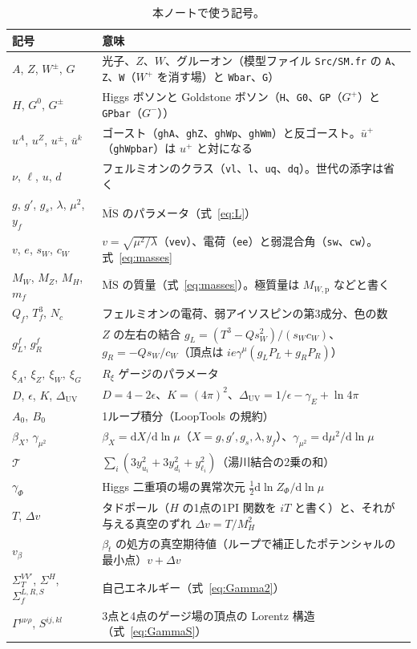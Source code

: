 \documentclass[a4paper,10pt]{ltjsarticle}
\newcommand{\dd}{\mathrm{d}}
\newcommand{\MSbar}{\overline{\mathrm{MS}}}
\newcommand{\DUV}{\Delta_{\mathrm{UV}}}
\newcommand{\sw}{s_W}
\newcommand{\cw}{c_W}
\begin{document}
\begin{table}[tbp]
\centering\small
\caption{本ノートで使う記号。}
\label{tab:notation}
\begin{tabularx}{\linewidth}{>{\raggedright\arraybackslash}p{4.1cm}X}
\toprule
\textbf{記号} & \textbf{意味} \\
\midrule
$A$, $Z$, $W^\pm$, $G$ & 光子、$Z$、$W$、グルーオン（模型ファイル \texttt{Src/SM.fr} の \texttt{A}、\texttt{Z}、\texttt{W}（$W^+$ を消す場）と \texttt{Wbar}、\texttt{G}） \\
$H$, $G^0$, $G^\pm$ & Higgs ボソンと Goldstone ボソン（\texttt{H}、\texttt{G0}、\texttt{GP}（$G^+$）と \texttt{GPbar}（$G^-$）） \\
$u^A$, $u^Z$, $u^\pm$, $\bar u^k$ & ゴースト（\texttt{ghA}、\texttt{ghZ}、\texttt{ghWp}、\texttt{ghWm}）と反ゴースト。$\bar u^+$（\texttt{ghWpbar}）は $u^+$ と対になる \\
$\nu$, $\ell$, $u$, $d$ & フェルミオンのクラス（\texttt{vl}、\texttt{l}、\texttt{uq}、\texttt{dq}）。世代の添字は省く \\
$g$, $g'$, $g_s$, $\lambda$, $\mu^2$, $y_f$ & $\MSbar$ のパラメータ（式~\eqref{eq:L}） \\
$v$, $e$, $\sw$, $\cw$ & $v=\sqrt{\mu^2/\lambda}$（\texttt{vev}）、電荷（\texttt{ee}）と弱混合角（\texttt{sw}、\texttt{cw}）。式~\eqref{eq:masses} \\
$M_W$, $M_Z$, $M_H$, $m_f$ & $\MSbar$ の質量（式~\eqref{eq:masses}）。極質量は $M_{W,\mathrm p}$ などと書く \\
$Q_f$, $T^3_f$, $N_c$ & フェルミオンの電荷、弱アイソスピンの第3成分、色の数 \\
$g_L^f$, $g_R^f$ & $Z$ の左右の結合 $g_L=(T^3-Q\sw^2)/(\sw\cw)$、$g_R=-Q\sw/\cw$（頂点は $ie\gamma^\mu(g_LP_L+g_RP_R)$） \\
$\xi_A,\ \xi_Z,\ \xi_W,\ \xi_G$ & $R_\xi$ ゲージのパラメータ \\
$D$, $\epsilon$, $K$, $\DUV$ & $D=4-2\epsilon$、$K=(4\pi)^2$、$\DUV=1/\epsilon-\gamma_E+\ln4\pi$ \\
$A_0,\ B_0$ & 1ループ積分（LoopTools の規約） \\
$\beta_X$, $\gamma_{\mu^2}$ & $\beta_X=\dd X/\dd\ln\mu$（$X=g,g',g_s,\lambda,y_f$）、$\gamma_{\mu^2}=\dd\mu^2/\dd\ln\mu$ \\
$\mathcal T$ & $\sum_{i}(3y_{u_i}^2+3y_{d_i}^2+y_{\ell_i}^2)$（湯川結合の2乗の和） \\
$\gamma_\Phi$ & Higgs 二重項の場の異常次元 $\frac12\dd\ln Z_\Phi/\dd\ln\mu$ \\
$T$, $\Delta v$ & タドポール（$H$ の1点の1PI 関数を $iT$ と書く）と、それが与える真空のずれ $\Delta v=T/M_H^2$ \\
$v_\beta$ & $\beta_t$ の処方の真空期待値（ループで補正したポテンシャルの最小点）$v+\Delta v$ \\
$\Sigma^{VV'}_T$, $\Sigma^H$, $\Sigma^{L,R,S}_f$ & 自己エネルギー（式~\eqref{eq:Gamma2}） \\
$\Gamma^{\mu\nu\rho}$, $S^{ij,kl}$ & 3点と4点のゲージ場の頂点の Lorentz 構造（式~\eqref{eq:GammaS}） \\
\bottomrule
\end{tabularx}
\end{table}
\end{document}
